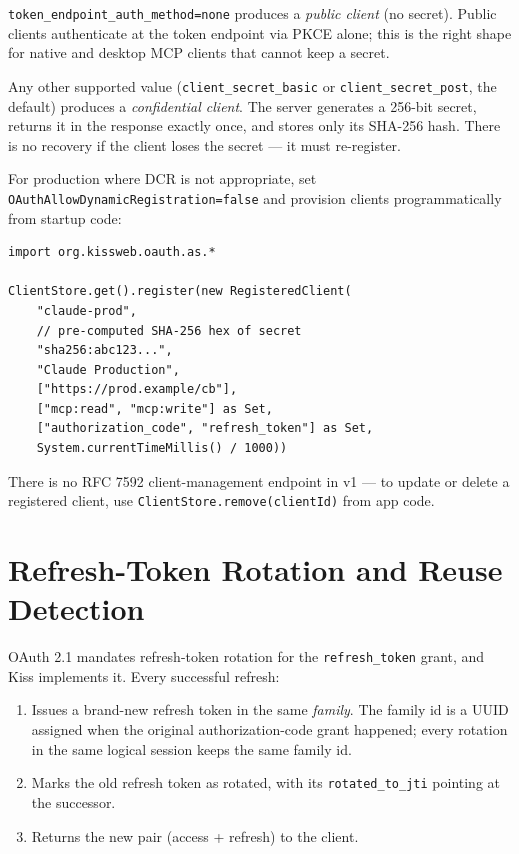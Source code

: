 \noindent
\texttt{token\_endpoint\_auth\_method=none} produces a \emph{public client} (no secret).  Public clients authenticate at the token endpoint via PKCE alone; this is the right shape for native and desktop MCP clients that cannot keep a secret.

Any other supported value (\texttt{client\_secret\_basic} or \texttt{client\_secret\_post}, the default) produces a \emph{confidential client}.  The server generates a 256-bit secret, returns it in the response exactly once, and stores only its SHA-256 hash.  There is no recovery if the client loses the secret --- it must re-register.

For production where DCR is not appropriate, set \texttt{OAuthAllowDynamic\-Registration=false} and provision clients programmatically from startup code:

\begin{lstlisting}[style=groovy]
import org.kissweb.oauth.as.*

ClientStore.get().register(new RegisteredClient(
    "claude-prod",
    // pre-computed SHA-256 hex of secret
    "sha256:abc123...",
    "Claude Production",
    ["https://prod.example/cb"],
    ["mcp:read", "mcp:write"] as Set,
    ["authorization_code", "refresh_token"] as Set,
    System.currentTimeMillis() / 1000))
\end{lstlisting}

There is no RFC 7592 client-management endpoint in v1 --- to update or delete a registered client, use \texttt{ClientStore.remove(clientId)} from app code.

\section{Refresh-Token Rotation and Reuse Detection}
\label{sec:as-rotation}

OAuth 2.1 mandates refresh-token rotation for the \texttt{refresh\_token} grant, and Kiss implements it.  Every successful refresh:

\begin{enumerate}
  \item Issues a brand-new refresh token in the same \emph{family}.  The family id is a UUID assigned when the original authorization-code grant happened; every rotation in the same logical session keeps the same family id.
  \item Marks the old refresh token as rotated, with its \texttt{rotated\_to\_jti} pointing at the successor.
  \item Returns the new pair (access + refresh) to the client.
\end{enumerate}

